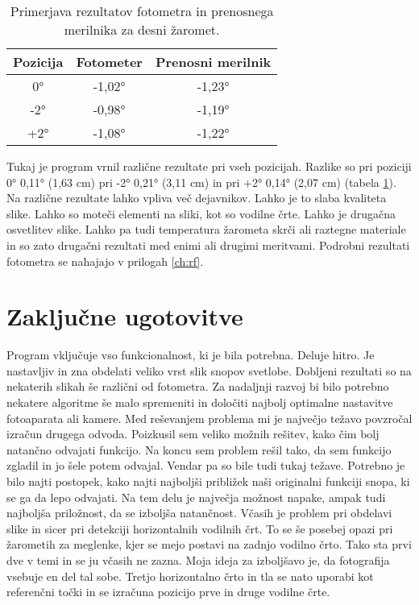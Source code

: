 \documentclass[oneside, a4paper, 12pt]{book}
\begin{document}
\begin{table}
\begin{center}
\begin{tabular}{c|c|c}
\textbf{Pozicija} & \textbf{Fotometer} & \textbf{Prenosni merilnik} \\ \hline
0° & -1,02° & -1,23°  \\ \hline
-2°  & -0,98° & -1,19°   \\ \hline
+2°  & -1,08° & -1,22°   \\ 
\end{tabular}
\end{center}
\vspace{-20pt}
\caption{Primerjava rezultatov fotometra in prenosnega merilnika za desni žaromet.}

\label{tbl:primerjava-desni}
\end{table}

Tukaj je program vrnil različne rezultate pri vseh pozicijah. Razlike so pri poziciji 0° 0,11° (1,63 cm) pri -2° 0,21° (3,11 cm) in pri +2° 0,14° (2,07 cm) (tabela \ref{tbl:primerjava-desni}). Na različne rezultate lahko vpliva več dejavnikov. Lahko je to slaba kvaliteta slike. Lahko so moteči elementi na sliki, kot so vodilne črte. Lahko je drugačna osvetlitev slike. Lahko pa tudi temperatura žarometa skrči ali raztegne materiale in so zato drugačni rezultati med enimi ali drugimi meritvami. Podrobni rezultati fotometra se nahajajo v prilogah \ref{ch:rf}.

\chapter{Zaključne ugotovitve}
\label{ch:zakljucek}
Program vključuje vso funkcionalnost, ki je bila potrebna. Deluje hitro. Je nastavljiv in zna obdelati veliko vrst slik snopov svetlobe. Dobljeni rezultati so na nekaterih slikah še različni od fotometra. Za nadaljnji razvoj bi bilo potrebno nekatere algoritme še malo spremeniti in določiti najbolj optimalne nastavitve fotoaparata ali kamere. Med reševanjem problema mi je največjo težavo povzročal izračun drugega odvoda. Poizkusil sem veliko možnih rešitev, kako čim bolj natančno odvajati funkcijo. Na koncu sem problem rešil tako, da sem funkcijo zgladil in jo šele potem odvajal. Vendar pa so bile tudi tukaj težave. Potrebno je bilo najti postopek, kako najti najboljši približek naši originalni funkciji snopa, ki se ga da lepo odvajati. Na tem delu je največja možnost napake, ampak tudi najboljša priložnost, da se izboljša natančnost. Včasih je problem pri obdelavi slike in sicer pri detekciji horizontalnih vodilnih črt. To se še posebej opazi pri žarometih za meglenke, kjer se mejo postavi na zadnjo vodilno črto. Tako sta prvi dve v temi in se ju včasih ne zazna. Moja ideja za izboljšavo je, da fotografija vsebuje en del tal sobe. Tretjo horizontalno črto in tla se nato uporabi kot referenčni točki in se izračuna pozicijo prve in druge vodilne črte.
\end{document}
